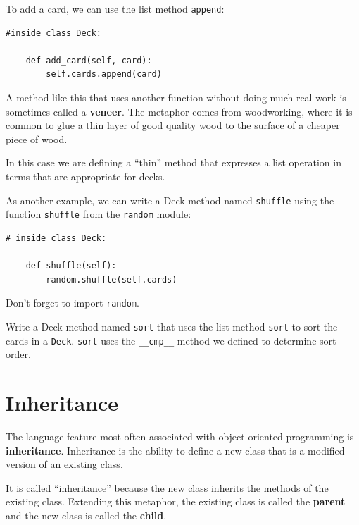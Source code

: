 \documentclass[10pt]{book}
\begin{document}
To add a card, we can use the list method {\tt append}:

\begin{verbatim}
#inside class Deck:

    def add_card(self, card):
        self.cards.append(card)
\end{verbatim}
%
A method like this that uses another function without doing
much real work is sometimes called a {\bf veneer}.  The metaphor
comes from woodworking, where it is common to glue a thin
layer of good quality wood to the surface of a cheaper piece of
wood.

In this case we are defining a ``thin'' method that expresses
a list operation in terms that are appropriate for decks.

As another example, we can write a Deck method named {\tt shuffle}
using the function {\tt shuffle} from the {\tt random} module:

\begin{verbatim}
# inside class Deck:

    def shuffle(self):
        random.shuffle(self.cards)
\end{verbatim}
%
Don't forget to import {\tt random}.

\begin{exercise}

Write a Deck method named {\tt sort} that uses the list method
{\tt sort} to sort the cards in a {\tt Deck}.  {\tt sort} uses
the \verb"__cmp__" method we defined to determine sort order.
\end{exercise}



\section{Inheritance}

The language feature most often associated with object-oriented
programming is {\bf inheritance}.  Inheritance is the ability to
define a new class that is a modified version of an existing
class.

It is called ``inheritance'' because the new class inherits the
methods of the existing class.  Extending this metaphor, the existing
class is called the {\bf parent} and the new class is
called the {\bf child}.
\end{document}
